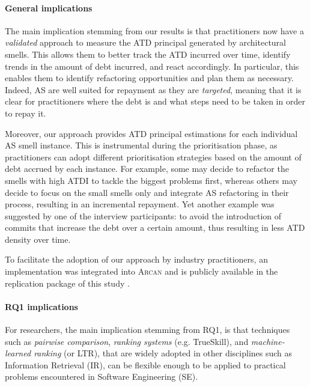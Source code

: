 \paragraph{General implications} The main implication stemming from our results is that practitioners now have a \emph{validated} approach to measure the ATD principal generated by architectural smells.
This allows them to better track the ATD incurred over time, identify trends in the amount of debt incurred, and react accordingly. 
In particular, this enables them to identify refactoring opportunities and plan them as necessary.
Indeed, AS are well suited for repayment as they are \emph{targeted}, meaning that it is clear for practitioners where the debt is and what steps need to be taken in order to repay it.

Moreover, our approach provides ATD principal estimations for each individual AS smell instance. 
This is instrumental during the prioritisation phase, as practitioners can adopt different prioritisation strategies based on the amount of debt accrued by each instance.
For example, some may decide to refactor the smells with high ATDI to tackle the biggest problems first, whereas others may decide to focus on the small smells only and integrate AS refactoring in their process, resulting in an incremental repayment.
Yet another example was suggested by one of the interview participants: to avoid the introduction of commits that increase the debt over a certain amount, thus resulting in less ATD density over time.

To facilitate the adoption of our approach by industry practitioners, an implementation was integrated into \textsc{Arcan} and is publicly available in the replication package of this study \cite{ReplicationPackageC6}.

\paragraph{RQ1 implications}
For researchers, the main implication stemming from RQ1, is that techniques such as \emph{pairwise comparison}, \emph{ranking systems} (e.g. TrueSkill), and \emph{machine-learned ranking} (or LTR), that are widely adopted in other disciplines such as Information Retrieval (IR), can be flexible enough to be applied to practical problems encountered in Software Engineering (SE).

